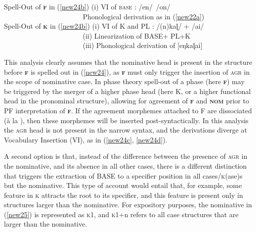 \documentclass[output=paper,colorlinks,citecolor=brown,
]{langscibook}
\begin{document}
\begin{exe}
\begin{xlist}
        \ex \label{new24d}
        Spell-Out of \textsc{\textbf{f}} in (\ref{new24b}) \rightarrow \hspace{0.1cm} (i) VI of \textsc{base} : /en/~/on/ \\
         \textcolor{white}{ooooooooooooooooooooo} Phonological derivation as in (\ref{new22a}) \\
         Spell-Out of \textsc{\textbf{k}} in (\ref{new24b})  \rightarrow \hspace{0.1cm} (i) VI of K and PL : /(n)kaɭ/ + /ai/ \\
         \textcolor{white}{ooooooooooooooooooooo} 	(ii) Linearization of BASE+ PL+K \\
          \textcolor{white}{ooooooooooooooooooooo}	(iii) Phonological derivation of [eŋkaɭai] 
    \end{xlist}
\end{exe}

This analysis clearly assumes that the nominative head is present in the structure before \textsc{\textbf{f}} is spelled out in (\ref{new24}), as \textsc{\textbf{f}} must only trigger the insertion of \textsc{agr} in the scope of nominative case. In phase theory spell-out of a phase (here \textsc{\textbf{f}}) may be triggered by the merger of a higher phase head (here K, or a higher functional head in the pronominal structure), allowing for agreement of \textsc{\textbf{f}} and \textsc{\textbf{nom}} prior to PF interpretation of \textsc{\textbf{f}}. If the agreement morphemes attached to F are dissociated (à la \citealt{Embick1997}), then these morphemes will be inserted post-syntactically. In this analysis the \textsc{agr} head is not present in the narrow syntax, and the derivations diverge at Vocabulary Insertion (VI), as in (\ref{new24c}, \ref{new24d}). 

A second option is that, instead of the difference between the presence of \textsc{agr} in the nominative, and its absence in all other cases, there is a different distinction that triggers the extraction of BASE to a specifier position in all cases/\textsc{k}(ase)s but the nominative. This type of account would entail that, for example, some feature in \textsc{k} attracts the root to its specifier, and this feature is present only in structures larger than the nominative. For expository purposes, the nominative in (\ref{new25})  is represented as \textsc{k}1, and \textsc{k}1+n refers to all case structures that are larger than the nominative.
\end{document}
